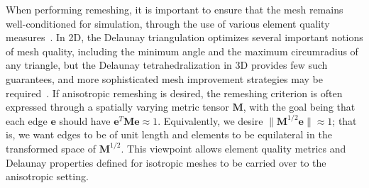 When performing remeshing, it is important to ensure that the mesh remains well-conditioned for simulation, through the use of various element quality measures~\cite{Shewchuk2002}.
In 2D, the Delaunay triangulation optimizes several important notions of mesh quality, including the minimum angle and the maximum circumradius of any triangle, but the Delaunay tetrahedralization in 3D provides few such guarantees, and more sophisticated mesh improvement strategies may be required~\cite{Wicke2010}.
If anisotropic remeshing is desired, the remeshing criterion is often expressed through a spatially varying metric tensor $\mathbf M$, with the goal being that each edge $\mathbf e$ should have $\mathbf e^T\mathbf M\mathbf e\approx1$.
Equivalently, we desire $\|\mathbf M^{1/2}\mathbf e\|\approx1$; that is, we want edges to be of unit length and elements to be equilateral in the transformed space of $\mathbf M^{1/2}$.
This viewpoint allows element quality metrics and Delaunay properties defined for isotropic meshes to be carried over to the anisotropic setting.

